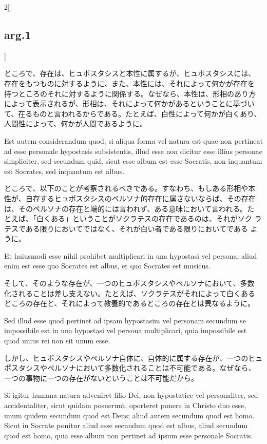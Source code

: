\documentclass[paper=a4paper,fontsize=10pt,jafontsize=9pt,titlepage]{jlreq}
\begin{document}
\begin{paracol}{2}[\subsection{arg.1}]
\switchcolumn

ところで、存在は、ヒュポスタシスと本性に属するが、ヒュポスタシスには、
存在をもつものに対するように、また、本性には、それによって何かが存在を
持つところのそれに対するように関係する。なぜなら、本性は、形相のあり方
によって表示されるが、形相は、それによって何かがあるということに基づい
て、在るものと言われるからである。たとえば、白性によって何かが白くあり、
人間性によって、何かが人間であるように。

\switchcolumn*

Est autem considerandum quod, si aliqua forma vel natura est quae non
pertineat ad esse personale hypostasis subsistentis, illud esse non
dicitur esse illius personae simpliciter, sed secundum quid, sicut
esse album est esse Socratis, non inquantum est Socrates, sed
inquantum est albus.

\switchcolumn

ところで、以下のことが考察されるべきである。すなわち、もしある形相や本
性が、自存するヒュポスタシスのペルソナ的存在に属さないならば、その存在
は、そのペルソナの存在と端的には言われず、ある意味において言われる。た
とえば、「白くある」ということがソクラテスの存在であるのは、それがソク
ラテスである限りにおいてではなく、それが白い者である限りにおいてである
ように。

\switchcolumn*

Et huiusmodi esse nihil prohibet multiplicari in una hypostasi vel
persona, aliud enim est esse quo Socrates est albus, et quo Socrates
est musicus.

\switchcolumn

そして、そのような存在が、一つのヒュポスタシスやペルソナにおいて、多数
化されることは差し支えない。たとえば、ソクラテスがそれによって白くある
ところの存在と、それによって教養的であるところの存在とは異なるように。

\switchcolumn*

Sed illud esse quod pertinet ad ipsam hypostasim vel personam secundum
se impossibile est in una hypostasi vel persona multiplicari, quia
impossibile est quod unius rei non sit unum esse.

\switchcolumn

しかし、ヒュポスタシスやペルソナ自体に、自体的に属する存在が、一つのヒュ
ポスタシスやペルソナにおいて多数化されることは不可能である。なぜなら、
一つの事物に一つの存在がないということは不可能だから。

\switchcolumn*

Si igitur humana natura adveniret filio Dei, non hypostatice vel
personaliter, sed accidentaliter, sicut quidam posuerunt, oporteret
ponere in Christo duo esse, unum quidem secundum quod est Deus; aliud
autem secundum quod est homo. Sicut in Socrate ponitur aliud esse
secundum quod est albus, aliud secundum quod est homo, quia esse album
non pertinet ad ipsum esse personale Socratis.


\end{paracol}
\end{document}
